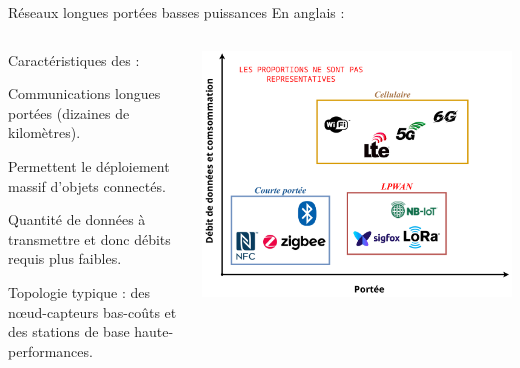 \documentclass[../main.tex]{subfiles}
\begin{document}
\begin{frame}{Réseaux longues portées basses puissances}
  {En anglais : }

  \begin{columns}
    \begin{column}{.5\linewidth}
      Caractéristiques des  \cite{IEEEStandardLPWAN} :

      \begin{ctrlitemize}{5pt}
        \item Communications longues portées (dizaines de kilomètres).
        \item Permettent le déploiement massif d'objets connectés.
        \item Quantité de données à transmettre et donc débits requis plus faibles.
        \item Topologie typique : des nœud-capteurs bas-coûts et des stations de base haute-performances.
      \end{ctrlitemize}
    \end{column}
    \begin{column}{.5\linewidth}
      \includegraphics[width=\linewidth, height=.65\textheight, keepaspectratio=true]{figures/drawiopdf/lpwan_and_co.pdf}
    \end{column}
  \end{columns}
\end{frame}
\end{document}
